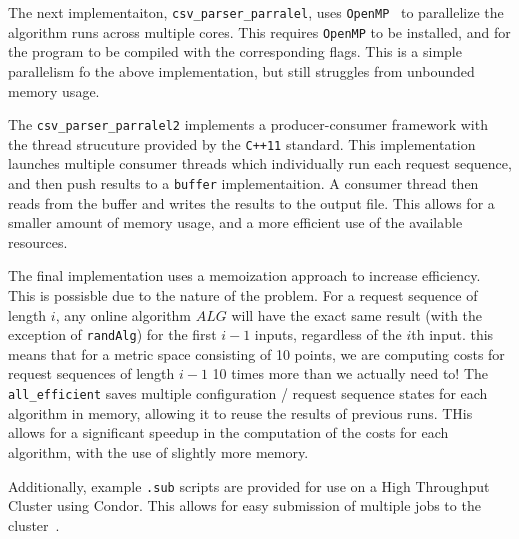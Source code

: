 The next implementaiton, \texttt{csv\_parser\_parralel}, uses \texttt{OpenMP}~\cite{openmp08} to parallelize the algorithm runs across multiple cores. This requires \texttt{OpenMP} to be installed, and for the program to be compiled with the corresponding flags. This is a simple parallelism fo the above implementation, but still struggles from unbounded memory usage.

The \texttt{csv\_parser\_parralel2} implements a producer-consumer framework with the thread strucuture provided by the \texttt{C++11} standard. This implementation launches multiple consumer threads which individually run each request sequence, and then push results to a \texttt{buffer} implementaition. A consumer thread then reads from the buffer and writes the results to the output file. This allows for a smaller amount of memory usage, and a more efficient use of the available resources.


The final implementation uses a memoization approach to increase efficiency. This is possisble due to the nature of the \KS problem. For a request sequence of length $i$, any online algorithm $ALG$ will have the exact same result (with the exception of \texttt{randAlg}) for the first $i-1$ inputs, regardless of the $i$th input. this means that for a metric space consisting of 10 points, we are computing costs for request sequences of length $i-1$ 10 times more than we actually need to! The \texttt{all\_efficient} saves multiple configuration / request sequence states for each algorithm in memory, allowing it to reuse the results of previous runs. THis allows for a significant speedup in the computation of the costs for each algorithm, with the use of slightly more memory.

Additionally, example \texttt{.sub} scripts are provided for use on a High Throughput Cluster using Condor. This allows for easy submission of multiple jobs to the cluster~\cite{htcondor}. 